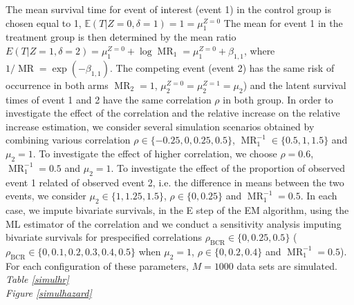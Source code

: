 \documentclass[twoside,a4paper,12pt]{article}
\def\MR{\operatorname{MR}}
\newcommand{\EE}{\mathbb{E}}
\def\BCR{\operatorname{BCR}}
\theoremstyle{plain}
\theoremstyle{definition}
\begin{document}
The mean survival time for event of interest (event 1) in the control group 
is chosen equal to 1, $\EE (T | Z=0, \delta=1) =1=\mu_1^{Z=0}$ %
The mean for event 1 in the treatment group is then determined by the 
mean ratio $E(T | Z=1,\delta=2) =\mu_1^{Z=0} +\log \MR_1=\mu_1^{Z=0} + \beta_{1,1}$, where  $1/\MR =\exp(-\beta_{1,1})$. 
The competing event (event 2) has the same risk of  occurrence in both arms 
{$\MR_{2}=1$}, $\mu^{Z=0}_{2}=\mu^{Z=1}_{2}=\mu_{2}$) and the latent survival times 
of event 1 and 2  have the same correlation $\rho$ in both group. 
In order to investigate the effect of the correlation and the {relative 
increase}  on the {relative increase} estimation, we consider several simulation 
scenarios obtained by combining various correlation $\rho \in \{-0.25, 0, 0.25, 0.5\}$,  
$\MR_1^{-1}\in \{0.5, 1, 1.5\}$ and 
$\mu_{2}=1$. 
To investigate the effect of higher correlation, we choose $\rho=0.6$, 
$\MR_{1}^{-1}=0.5$ and $\mu_{2}=1$. 
To investigate the effect of the proportion of observed event 1 related of 
observed event 2, i.e. 
the difference in means between the two events, we consider $\mu_{2}\in 
\{1,1.25,1.5\}$, $\rho \in \{0, 0.25\}$ and $\MR_{1}^{-1}=0.5$. 
In each case, we impute bivariate survivals, in the E step of the EM algorithm, 
using the ML estimator of the correlation and we conduct a sensitivity analysis 
imputing bivariate survivals for prespecified correlations $\rho_{\BCR} \in \{0, 
0.25, 0.5\}$ ($\rho_{\BCR} \in \{0, 0.1, 0.2, 0.3, 0.4, 0.5\}$ 
when $\mu_{2}=1$, $\rho \in \{0, 0.2, 0.4\}$ and $\MR_{1}^{-1}=0.5$). 
For each configuration of these parameters, $M=1000$ data sets are simulated.\\


\noindent \textit{Table \ref{simulhr}}\\


\noindent \textit{Figure \ref{simulhazard}}\\
\end{document}
